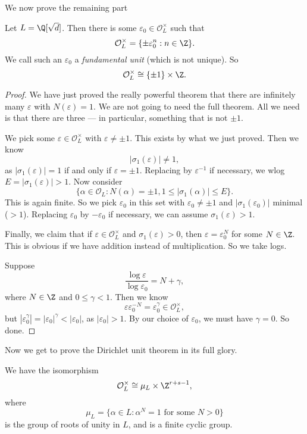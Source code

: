 \documentclass[a4paper]{article}
\begin{document}
We now prove the remaining part
\begin{thm}
  Let $L = \Q[\sqrt{d}]$. Then there is some $\varepsilon_0 \in \mathcal{O}_L^\times$ such that
  \[
    \mathcal{O}_L^\times = \{\pm \varepsilon_0^n : n \in \Z\}.
  \]
  We call such an $\varepsilon_0$ a \emph{fundamental unit} (which is not unique). So
  \[
    \mathcal{O}_L^\times \cong \{\pm 1\} \times \Z.
  \]
\end{thm}

\begin{proof}
  We have just proved the really powerful theorem that there are infinitely many $\varepsilon$ with $N(\varepsilon) = 1$. We are not going to need the full theorem. All we need is that there are three --- in particular, something that is not $\pm 1$.

  We pick some $\varepsilon \in \mathcal{O}_L^\times$ with $\varepsilon \not= \pm 1$. This exists by what we just proved. Then we know
  \[
    |\sigma_1(\varepsilon)| \not= 1,
  \]
  as $|\sigma_1(\varepsilon)| = 1$ if and only if $\varepsilon = \pm 1$. Replacing by $\varepsilon^{-1}$ if necessary, we wlog $E = |\sigma_1(\varepsilon)| > 1$. Now consider
  \[
    \{\alpha \in \mathcal{O}_L: N(\alpha) = \pm 1, 1 \leq |\sigma_1(\alpha)| \leq E\}.
  \]
  This is again finite. So we pick $\varepsilon_0$ in this set with $\varepsilon_0 \not= \pm 1$ and $|\sigma_1(\varepsilon_0)|$ minimal ($> 1$). Replacing $\varepsilon_0$ by $-\varepsilon_0$ if necessary, we can assume $\sigma_1(\varepsilon) > 1$.

  Finally, we claim that if $\varepsilon \in \mathcal{O}_L^\times$ and $\sigma_1(\varepsilon) > 0$, then $\varepsilon = \varepsilon_0^N$ for some $N \in \Z$. This is obvious if we have addition instead of multiplication. So we take logs.

  Suppose
  \[
    \frac{\log \varepsilon}{\log \varepsilon_0} = N + \gamma,
  \]
  where $N \in \Z$ and $0 \leq \gamma < 1$. Then we know
  \[
    \varepsilon\varepsilon_0^{-N} = \varepsilon_0^\gamma \in \mathcal{O}_L^{\times},
  \]
  but $|\varepsilon_0^\gamma| = |\varepsilon_0|^\gamma < |\varepsilon_0|$, as $|\varepsilon_0| > 1$. By our choice of $\varepsilon_0$, we must have $\gamma = 0$. So done.
\end{proof}

Now we get to prove the Dirichlet unit theorem in its full glory.
\begin{thm}
  We have the isomorphism
  \[
    \mathcal{O}_L^\times \cong \mu_L \times \Z^{r + s - 1},
  \]
  where
  \[
    \mu_L = \{\alpha \in L: \alpha^N = 1\text{ for some }N > 0\}
  \]
  is the group of roots of unity in $L$, and is a finite cyclic group.
\end{thm}
\end{document}
